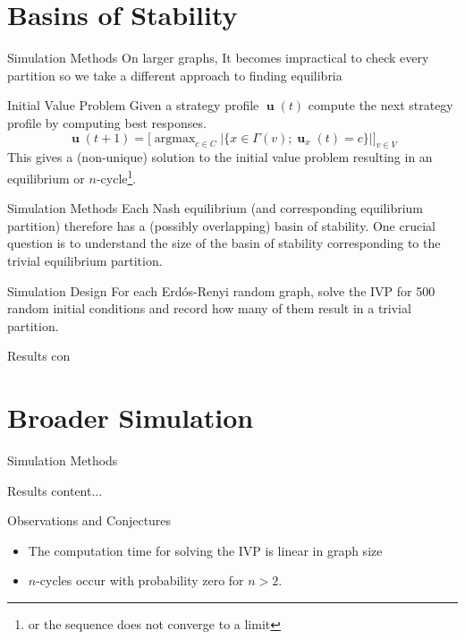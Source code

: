 \documentclass{beamer}
\DeclareMathOperator*{\argmax}{\text{argmax}}
\DeclareMathOperator{\uu}{\mathbf{u}}
\begin{document}
\section{Basins of Stability}
\begin{frame}{Simulation Methods}
	On larger graphs, It becomes impractical to check every partition so we take a different approach to finding equilibria
	\begin{block}{Initial Value Problem}
		Given a strategy profile $\uu(t)$ compute the next strategy profile by computing best responses.
		\begin{equation*}
			\uu(t+1)=\big[\argmax_{c\in C}|\{x\in\Gamma(v); \uu_x(t)=c\} |]_{v\in V}
		\end{equation*}
		This gives a (non-unique) solution to the initial value problem resulting in an equilibrium or $n$-cycle\footnote{or the sequence does not converge to a limit}.
	\end{block}
\end{frame}
\begin{frame}{Simulation Methods}
	Each Nash equilibrium (and corresponding equilibrium partition) therefore has a (possibly overlapping) basin of stability. One crucial question is to understand the size of the basin of stability corresponding to the trivial equilibrium partition. 
	\begin{block}{Simulation Design}
		For each Erd\'os-Renyi random graph, solve the IVP for 500 random initial conditions and record how many of them result in a trivial partition. 
	\end{block}
\end{frame}
\begin{frame}{Results}
	con
\end{frame}
\section{Broader Simulation}
\begin{frame}{Simulation Methods}
	
\end{frame}
\begin{frame}{Results}
	content...
\end{frame}
\begin{frame}{Observations and Conjectures}
	\begin{itemize}
		\item The computation time for solving the IVP is linear in graph size
		\item $n$-cycles occur with probability zero for $n>2$. 
	\end{itemize}
\end{frame}
\end{document}
